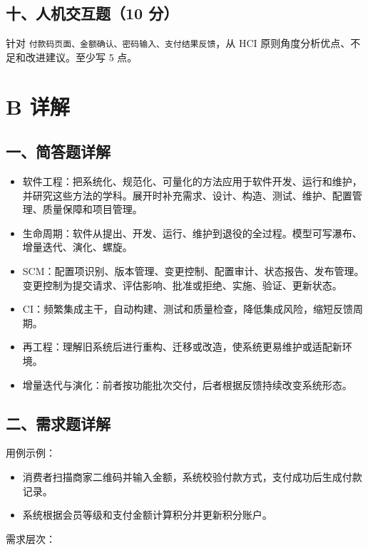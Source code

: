\documentclass[UTF8,zihao=-4]{ctexart}
\begin{document}
\subsection{十、人机交互题（10 分）}


针对 \texttt{付款码页面、金额确认、密码输入、支付结果反馈}，从 HCI 原则角度分析优点、不足和改进建议。至少写 5 点。


\section{B 详解}


\subsection{一、简答题详解}


\begin{itemize}
\item 软件工程：把系统化、规范化、可量化的方法应用于软件开发、运行和维护，并研究这些方法的学科。展开时补充需求、设计、构造、测试、维护、配置管理、质量保障和项目管理。
\item 生命周期：软件从提出、开发、运行、维护到退役的全过程。模型可写瀑布、增量迭代、演化、螺旋。
\item SCM：配置项识别、版本管理、变更控制、配置审计、状态报告、发布管理。变更控制为提交请求、评估影响、批准或拒绝、实施、验证、更新状态。
\item CI：频繁集成主干，自动构建、测试和质量检查，降低集成风险，缩短反馈周期。
\item 再工程：理解旧系统后进行重构、迁移或改造，使系统更易维护或适配新环境。
\item 增量迭代与演化：前者按功能批次交付，后者根据反馈持续改变系统形态。
\end{itemize}



\subsection{二、需求题详解}


用例示例：


\begin{itemize}
\item 消费者扫描商家二维码并输入金额，系统校验付款方式，支付成功后生成付款记录。
\item 系统根据会员等级和支付金额计算积分并更新积分账户。
\end{itemize}


需求层次：
\end{document}
